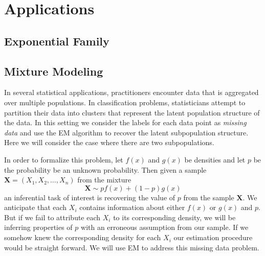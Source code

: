 \documentclass{article}
\begin{document}
\section{Applications}
\subsection{Exponential Family}

\subsection{Mixture Modeling}

In several statistical applications, practitioners encounter data that is aggregated over multiple populations. In classification problems, statisticians attempt to partition their data into clusters that represent the latent population structure of the data. In this setting we consider the labels for each data point as \textit{missing data} and use the EM algorithm to recover the latent subpopulation structure. Here we will consider the case where there are two subpopulations. 

In order to formalize this problem, let $f(x)$ and $g(x)$ be densities and let $p$ be the probability be an unknown probability. Then given a sample $\mathbf{X} = (X_1, X_2, \ldots, X_n)$ from the mixture $$\mathbf{X}\sim pf(x) + (1-p)g(x)$$ an inferential task of interest is recovering the value of $p$ from the sample $\mathbf{X}$. We anticipate that each $X_i$ contains information about either $f(x)$ or $g(x)$ and $p$. But if we fail to attribute each $X_i$ to its corresponding density, we will be inferring properties of $p$ with an erroneous assumption from our sample. If we somehow knew the corresponding density for each $X_i$ our estimation procedure would be straight forward. We will use EM to address this missing data problem. 
\end{document}

